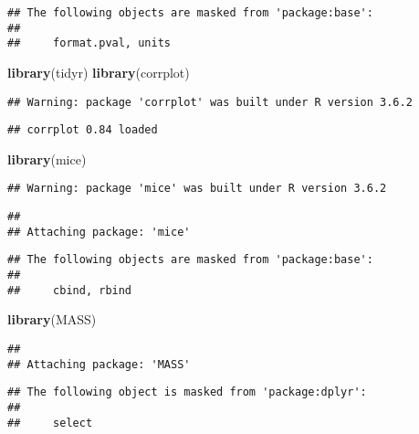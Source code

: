 \documentclass[
]{article}
\newenvironment{Shaded}{\begin{snugshade}}{\end{snugshade}}
\newcommand{\KeywordTok}[1]{\textcolor[rgb]{0.13,0.29,0.53}{\textbf{#1}}}
\newcommand{\NormalTok}[1]{#1}
\begin{document}
\begin{verbatim}
## The following objects are masked from 'package:base':
## 
##     format.pval, units
\end{verbatim}

\begin{Shaded}
\begin{Highlighting}[]
\KeywordTok{library}\NormalTok{(tidyr)}
\KeywordTok{library}\NormalTok{(corrplot)}
\end{Highlighting}
\end{Shaded}

\begin{verbatim}
## Warning: package 'corrplot' was built under R version 3.6.2
\end{verbatim}

\begin{verbatim}
## corrplot 0.84 loaded
\end{verbatim}

\begin{Shaded}
\begin{Highlighting}[]
\KeywordTok{library}\NormalTok{(mice)}
\end{Highlighting}
\end{Shaded}

\begin{verbatim}
## Warning: package 'mice' was built under R version 3.6.2
\end{verbatim}

\begin{verbatim}
## 
## Attaching package: 'mice'
\end{verbatim}

\begin{verbatim}
## The following objects are masked from 'package:base':
## 
##     cbind, rbind
\end{verbatim}

\begin{Shaded}
\begin{Highlighting}[]
\KeywordTok{library}\NormalTok{(MASS)}
\end{Highlighting}
\end{Shaded}

\begin{verbatim}
## 
## Attaching package: 'MASS'
\end{verbatim}

\begin{verbatim}
## The following object is masked from 'package:dplyr':
## 
##     select
\end{verbatim}
\end{document}
